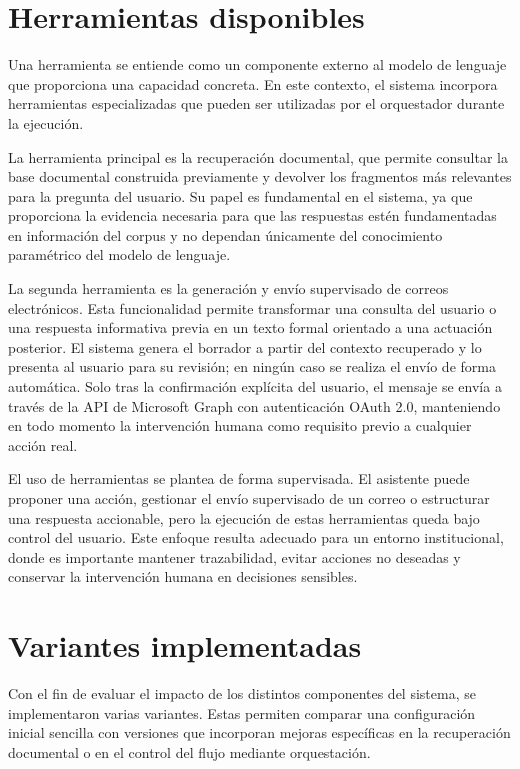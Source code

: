 \section{Herramientas disponibles}\label{sec:herramientas-disponibles}


Una herramienta se entiende como un componente externo al modelo de lenguaje que proporciona una capacidad concreta.
En este contexto, el sistema incorpora herramientas especializadas que pueden ser utilizadas por el orquestador durante la ejecución. 

La herramienta principal es la recuperación documental, que permite consultar la base documental construida previamente y devolver los fragmentos más relevantes para la pregunta del usuario. 
Su papel es fundamental en el sistema, ya que proporciona la evidencia necesaria para que las respuestas estén fundamentadas en información del corpus y no dependan únicamente del conocimiento paramétrico del modelo de lenguaje.

La segunda herramienta es la generación y envío supervisado de correos electrónicos.
Esta funcionalidad permite transformar una consulta del usuario o una respuesta informativa previa en un texto formal orientado a una actuación posterior.
El sistema genera el borrador a partir del contexto recuperado y lo presenta al usuario para su revisión; en ningún caso se realiza el envío de forma automática.
Solo tras la confirmación explícita del usuario, el mensaje se envía a través de la API de Microsoft Graph con autenticación OAuth 2.0, manteniendo en todo momento la intervención humana como requisito previo a cualquier acción real.

El uso de herramientas se plantea de forma supervisada. 
El asistente puede proponer una acción, gestionar el envío supervisado de un correo o estructurar una respuesta accionable, pero la ejecución de estas herramientas queda bajo control del usuario. 
Este enfoque resulta adecuado para un entorno institucional, donde es importante mantener trazabilidad, evitar acciones no deseadas y conservar la intervención humana en decisiones sensibles.

\section{Variantes implementadas}\label{sec:variantes-implementadas}

Con el fin de evaluar el impacto de los distintos componentes del sistema, se implementaron varias variantes. 
Estas permiten comparar una configuración inicial sencilla con versiones que incorporan mejoras específicas en la recuperación documental o en el control del flujo mediante orquestación.


